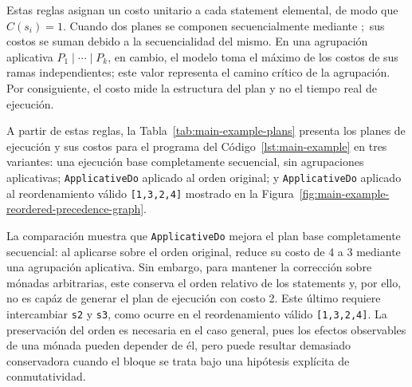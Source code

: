Estas reglas asignan un costo unitario a cada statement elemental, de modo que $C(s_i)=1$. Cuando dos planes se componen secuencialmente mediante $;$ sus costos se suman debido a la secuencialidad del mismo. En una agrupación aplicativa $P_1\mid\cdots\mid P_k$, en cambio, el modelo toma el máximo de los costos de sus ramas independientes; este valor representa el camino crítico de la agrupación. Por consiguiente, el costo mide la estructura del plan y no el tiempo real de ejecución.

A partir de estas reglas, la Tabla~\ref{tab:main-example-plans} presenta los planes de ejecución y sus costos para el programa del Código~\ref{lst:main-example} en tres variantes: una ejecución base completamente secuencial, sin agrupaciones aplicativas; \texttt{ApplicativeDo} aplicado al orden original; y \texttt{ApplicativeDo} aplicado al reordenamiento válido \texttt{[1,3,2,4]} mostrado en la Figura~\ref{fig:main-example-reordered-precedence-graph}.

\begin{table}[!ht]
\centering
\TableSetup
{}
\caption{Comparación de planes y costos estructurales para el ejemplo académico.}
\label{tab:main-example-plans}
\end{table}

La comparación muestra que \texttt{ApplicativeDo} mejora el plan base completamente secuencial: al aplicarse sobre el orden original, reduce su costo de 4 a 3 mediante una agrupación aplicativa. Sin embargo, para mantener la corrección sobre mónadas arbitrarias, este conserva el orden relativo de los statements y, por ello, no es capáz de generar el plan de ejecución con costo 2. Este último requiere intercambiar \texttt{s2} y \texttt{s3}, como ocurre en el reordenamiento válido \texttt{[1,3,2,4]}. La preservación del orden es necesaria en el caso general, pues los efectos observables de una mónada pueden depender de él, pero puede resultar demasiado conservadora cuando el bloque se trata bajo una hipótesis explícita de conmutatividad.

